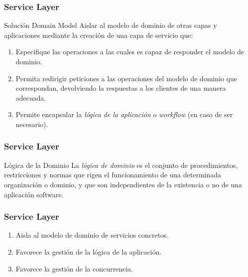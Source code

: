 \documentclass[handout,a4paper,slidestop,xcolor=pst,blue]{beamer}
\begin{document}
\begin{frame}[c]
    \frametitle{Service Layer}
    \begin{block}{Solución Domain Model}
        Aislar al modelo de dominio de otras capas y aplicaciones mediante la creación de una capa de servicio que:
        \begin{enumerate}
            \item<2-> Especifique las operaciones a las cuales es capaz de responder el modelo de dominio.
            \item<3-> Permita redirigir peticiones a las operaciones del modelo de dominio que correspondan, devolviendo la respuestas a los clientes de una manera adecuada.
            \item<4-> Permite encapsular la \emph{lógica de la aplicación} o \emph{workflow} (en caso de ser necesario).
        \end{enumerate}
    \end{block}
\end{frame}

\begin{frame}[c]
    \frametitle{Service Layer}
    \begin{block}{Lógica de la Dominio}
        La \emph{lógica de dominio} es el conjunto de procedimientos, restricciones y normas que rigen el funcionamiento de una determinada organización o dominio, y que son independientes de la existencia o no de una aplicación software.
    \end{block}
\end{frame}

\begin{frame}[c]
    \frametitle{Service Layer}
    \begin{enumerate}
        \item<1-> Aisla al modelo de dominio de servicios concretos.
        \item<2-> Favorece la gestión de la lógica de la aplicación.
        \item<3-> Favorece la gestión de la concurrencia.
    \end{enumerate}
\end{frame}
\end{document}
